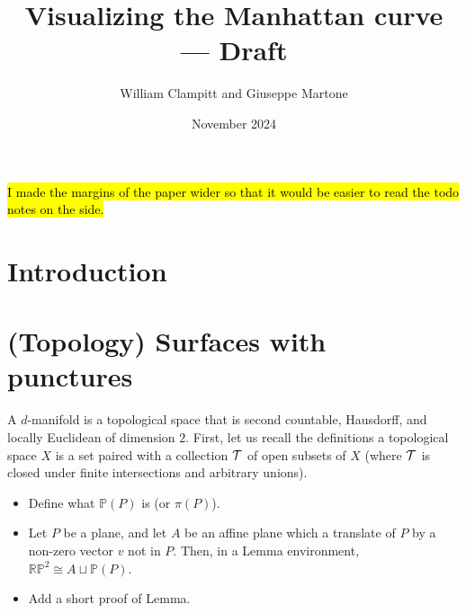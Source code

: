 \documentclass{amsart}
\title{Visualizing the Manhattan curve --- Draft}
\author{William Clampitt and Giuseppe Martone}
\date{November 2024}
\begin{document}
	\maketitle
	\tableofcontents
	
	\hl{I made the margins of the paper wider so that it would be easier to read the todo notes on the side.}
	\section{Introduction}
	\section{(Topology) Surfaces with punctures}
	
	A $d$-manifold is a topological space that is second countable, Hausdorff, and locally Euclidean of dimension $2$. First, let us recall the definitions a topological space $X$ is a set paired with a collection $\mathcal{T}$ of open subsets of $X$ (where $\mathcal{T}$ is closed under finite intersections and arbitrary unions). 
	
	\begin{tcolorbox}
		\begin{itemize}
			\item Define what $\mathbb P(P)$ is (or $\pi(P)$).
			\item Let $P$ be a plane, and let $A$ be an affine plane which a translate of $P$ by a non-zero vector $v$ not in $P$. Then, in a Lemma environment, $\mathbb {RP}^2\cong A\sqcup \mathbb{P}(P)$.
			\item Add a short proof of Lemma.
		\end{itemize}
	\end{tcolorbox}
\end{document}
